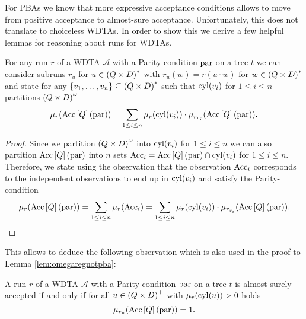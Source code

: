 For \acp{PBA} we know that more expressive acceptance conditions allows to
move from positive acceptance to almost-sure acceptance. Unfortunately, this 
does not translate to choiceless \acp{WDTA}. In order to show this we derive a
few helpful lemmas for reasoning about runs for \acp{WDTA}.
\begin{lemma}
  For any run $r$ of a \ac{WDTA} $\mathcal{A}$ with a Parity-condition 
  $\operatorname{par}$ on a tree $t$ we can consider subruns $r_{u}$ for 
  $u\in\left(Q\times D\right)^{*}$ with $r_{u}(w) = r(u\cdot w)$ for 
  $w\in\left(Q\times D\right)^{*}$ and state for any 
  $\left\{v_{1},\dots, v_{n}\right\}\subseteq\left(Q\times D\right)^{*}$ such that
  $\operatorname{cyl}(v_{i})$ for $1\leq i\leq n$ partitions $\left(Q\times D\right)^{\omega}$
  \begin{equation*}
    \mu_{r}(\operatorname{Acc}\left[Q\right](\operatorname{par})) = \sum\limits_{1\leq i\leq n}
      \mu_{r}(\operatorname{cyl}(v_{i}))\cdot\mu_{r_{v_{i}}}(\operatorname{Acc}\left[Q\right](\operatorname{par})).
  \end{equation*}
  \label{lem:subrunsum}
\end{lemma}
\begin{proof}
  Since we partition $\left(Q\times D\right)^{\omega}$ into $\operatorname{cyl}(v_{i})$ for
  $1\leq i\leq n$ we can also partition $\operatorname{Acc}\left[Q\right](\operatorname{par})$ into $n$
  sets $\operatorname{Acc}_{i} = \operatorname{Acc}\left[Q\right](\operatorname{par})\cap\operatorname{cyl}(v_{i})$ for
  $1\leq i\leq n$. Therefore, we state using the observation that the
  observation $\operatorname{Acc}_{i}$ corresponds to the independent observations to end up
  in $\operatorname{cyl}(v_{i})$ and satisfy the Parity-condition
  \begin{equation*}
    \mu_{r}(\operatorname{Acc}\left[Q\right](\operatorname{par})) = \sum\limits_{1\leq i\leq n}
      \mu_{r}(\operatorname{Acc}_{i}) = \sum\limits_{1\leq i\leq n}
      \mu_{r}(\operatorname{cyl}(v_{i}))\cdot\mu_{r_{v_{i}}}(\operatorname{Acc}\left[Q\right](\operatorname{par})).
  \end{equation*}
\end{proof}
This allows to deduce the following observation which is also used in the
proof to Lemma \ref{lem:omegaregnotpba}:
\begin{lemma}
  A run $r$ of a \ac{WDTA} $\mathcal{A}$ with a Parity-condition $\operatorname{par}$ on 
  a tree $t$ is almost-surely accepted if and only if for all 
  $u\in\left(Q\times D\right)^{+}$ with $\mu_{r}(\operatorname{cyl}(u)) > 0$ holds
  \begin{equation*}
    \mu_{r_{u}}(\operatorname{Acc}\left[Q\right](\operatorname{par})) = 1.
  \end{equation*}
  \label{lem:subrun1}
\end{lemma}
